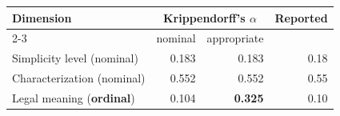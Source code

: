\begin{tabular}{lrrr}
\toprule
Dimension & \multicolumn{2}{c}{Krippendorff's $\alpha$} & Reported \\
\cmidrule(lr){2-3}
 & nominal & appropriate & \citep{beauchemin2025judgebert} \\
\midrule
Simplicity level (nominal) & 0.183 & 0.183 & 0.18 \\
Characterization (nominal) & 0.552 & 0.552 & 0.55 \\
Legal meaning (\textbf{ordinal}) & 0.104 & \textbf{0.325} & 0.10 \\
\bottomrule
\end{tabular}